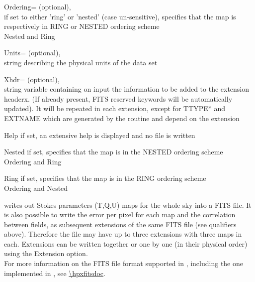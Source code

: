 \begin{qualifiers}
\begin{qulist}{}
	\item[{Ordering=}] 
		  (optional), \\
		if set to either 'ring' or 'nested' (case un-sensitive),
		  specifies that the map is respectively in RING or NESTED
		  ordering scheme\\
		\seealso Nested and Ring

	\item[{Units=}] 
		(optional), \\
		string describing the physical units of the data set

       \item[{Xhdr=}] 
		  (optional), \\
		string variable containing on input  the information to be added
		  to the extension headerx. (If already present, FITS reserved
		  keywords will be automatically updated). It will be
		    repeated in each extension, except for TTYPE* and EXTNAME which
		    are generated by the routine and depend on the extension

  \end{qulist}
\end{qualifiers}

\begin{keywords}
  \begin{kwlist}{} %
	\item[{Help}]   if set, an extensive help is displayed and no
	file is written
	\item[{Nested}]   if set, specifies that the map is in the NESTED ordering
	scheme\\
	\seealso Ordering and Ring 
	\item[{Ring}]   if set, specifies that the map is in the RING ordering
	scheme\\
	\seealso Ordering and Nested
   \end{kwlist}
\end{keywords}

\begin{codedescription}
{\thedocid{} writes out Stokes parameters (T,Q,U) maps for the whole
sky into a FITS file. It is also possible to write the error per pixel for each
map and the correlation between fields, as subsequent extensions of the same FITS
file (see qualifiers above). Therefore the file may have up to three extensions with three
maps in each. Extensions can be written together or one by one (in
their physical order) using the Extension option.\\
For more information on the FITS file format supported in \healpix, 
including the one implemented in \facname,
see \url{\hpxfitsdoc}.}
\end{codedescription}



